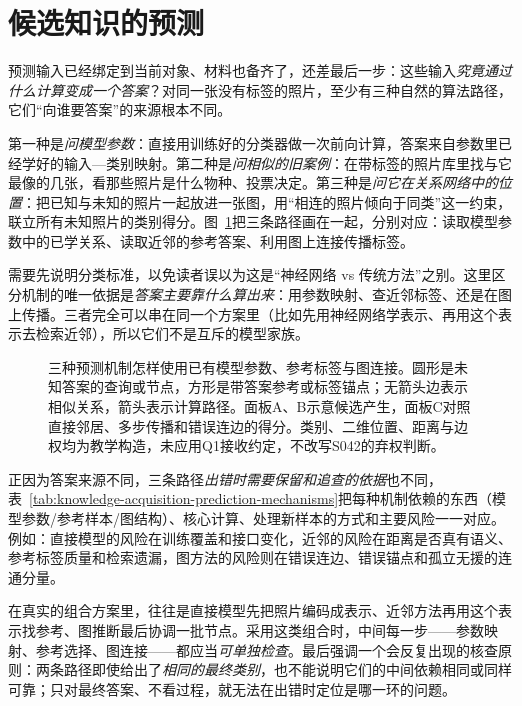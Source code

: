 \section{候选知识的预测}
\label{sec:knowledge-acquisition-candidate-prediction}

预测输入已经绑定到当前对象、材料也备齐了，还差最后一步：这些输入\emph{究竟通过什么计算变成一个答案}？对同一张没有标签的照片，至少有三种自然的算法路径，它们“向谁要答案”的来源根本不同。

第一种是\emph{问模型参数}：直接用训练好的分类器做一次前向计算，答案来自参数里已经学好的输入—类别映射。第二种是\emph{问相似的旧案例}：在带标签的照片库里找与它最像的几张，看那些照片是什么物种、投票决定。第三种是\emph{问它在关系网络中的位置}：把已知与未知的照片一起放进一张图，用“相连的照片倾向于同类”这一约束，联立所有未知照片的类别得分。图~\ref{fig:knowledge-acquisition-prediction-mechanisms}把三条路径画在一起，分别对应：读取模型参数中的已学关系、读取近邻的参考答案、利用图上连接传播标签。

需要先说明分类标准，以免读者误以为这是“神经网络 vs 传统方法”之别。这里区分机制的唯一依据是\emph{答案主要靠什么算出来}：用参数映射、查近邻标签、还是在图上传播。三者完全可以串在同一个方案里（比如先用神经网络学表示、再用这个表示去检索近邻），所以它们不是互斥的模型家族。

\begin{figure}[htbp]
  \centering
  
  \caption{三种预测机制怎样使用已有模型参数、参考标签与图连接。圆形是未知答案的查询或节点，方形是带答案参考或标签锚点；无箭头边表示相似关系，箭头表示计算路径。面板A、B示意候选产生，面板C对照直接邻居、多步传播和错误连边的得分。类别、二维位置、距离与边权均为教学构造，未应用Q1接收约定，不改写S042的弃权判断。}
  \label{fig:knowledge-acquisition-prediction-mechanisms}
\end{figure}

正因为答案来源不同，三条路径\emph{出错时需要保留和追查的依据}也不同，表~\ref{tab:knowledge-acquisition-prediction-mechanisms}把每种机制依赖的东西（模型参数/参考样本/图结构）、核心计算、处理新样本的方式和主要风险一一对应。例如：直接模型的风险在训练覆盖和接口变化，近邻的风险在距离是否真有语义、参考标签质量和检索遗漏，图方法的风险则在错误连边、错误锚点和孤立无援的连通分量。

在真实的组合方案里，往往是直接模型先把照片编码成表示、近邻方法再用这个表示找参考、图推断最后协调一批节点。采用这类组合时，中间每一步——参数映射、参考选择、图连接——都应当\emph{可单独检查}。最后强调一个会反复出现的核查原则：两条路径即使给出了\emph{相同的最终类别}，也不能说明它们的中间依赖相同或同样可靠；只对最终答案、不看过程，就无法在出错时定位是哪一环的问题。

